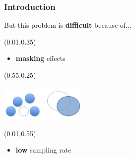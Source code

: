 \documentclass[final]{beamer}
\begin{document}

\begin{frame}

\frametitle{Introduction}

\vspace{-100pt}
But this problem is \textbf{difficult} because of...


\begin{textblock}{0.3}(0.01,0.35)
\begin{itemize}
\item{\color{red}\textbf{masking} effects}
\end{itemize}
\end{textblock}


\begin{textblock}{0.5}(0.55,0.25)





\includegraphics[width=2cm]{images/miss.png} \includegraphics[width=2cm]{images/hidden.png}





\end{textblock}


\begin{textblock}{1}(0.01,0.55)
\begin{itemize}
\item {\color{red} \textbf{low} sampling rate}
\end{itemize}
\end{textblock}


\end{frame}
\end{document}
